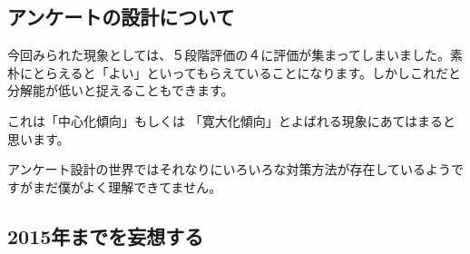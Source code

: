 \documentclass[mingoth,a4paper]{jsarticle}
\begin{document}
\subsection{アンケートの設計について}

今回みられた現象としては、５段階評価の４に評価が集まってしまいました。素
朴にとらえると「よい」といってもらえていることになります。しかしこれだと
分解能が低いと捉えることもできます。

これは「中心化傾向」もしくは
「寛大化傾向」とよばれる現象にあてはまると思います。

アンケート設計の世界ではそれなりにいろいろな対策方法が存在しているようで
すがまだ僕がよく理解できてません。

\clearpage %


\subsection{2015年までを妄想する}
\end{document}

